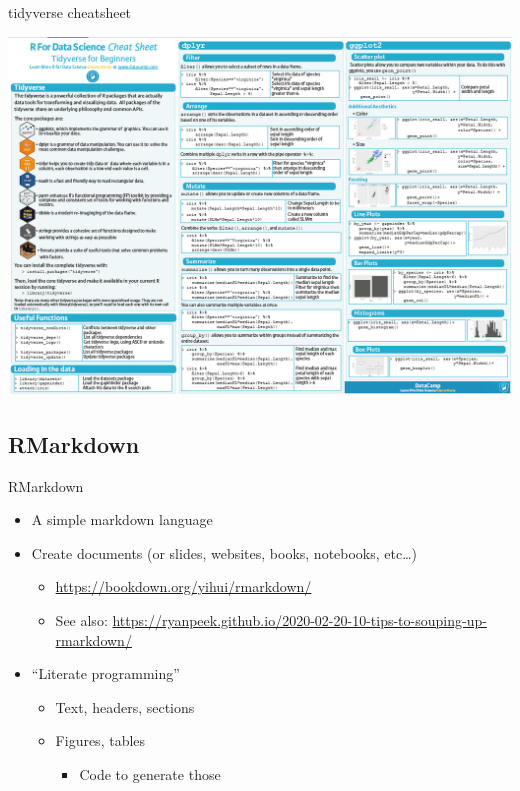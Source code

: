 \documentclass[
  ignorenonframetext,
]{beamer}
\providecommand{\tightlist}{%
  \setlength{\itemsep}{0pt}\setlength{\parskip}{0pt}}
\begin{document}
\begin{frame}{tidyverse cheatsheet}
\protect\hypertarget{tidyverse-cheatsheet}{}

\includegraphics{../external/images/r_cheatsheet_tidy.PNG}

\end{frame}

\hypertarget{rmarkdown}{%
\subsection{RMarkdown}\label{rmarkdown}}

\begin{frame}{RMarkdown}
\protect\hypertarget{rmarkdown-1}{}

\begin{itemize}[<+->]
\tightlist
\item
  A simple markdown language
\item
  Create documents (or slides, websites, books, notebooks, etc\ldots)

  \begin{itemize}[<+->]
  \tightlist
  \item
    \url{https://bookdown.org/yihui/rmarkdown/}
  \item
    See also:
    \url{https://ryanpeek.github.io/2020-02-20-10-tips-to-souping-up-rmarkdown/}
  \end{itemize}
\item
  ``Literate programming''

  \begin{itemize}[<+->]
  \tightlist
  \item
    Text, headers, sections
  \item
    Figures, tables

    \begin{itemize}[<+->]
    \tightlist
    \item
      Code to generate those
    \end{itemize}
  \end{itemize}
\end{itemize}

\end{frame}
\end{document}
